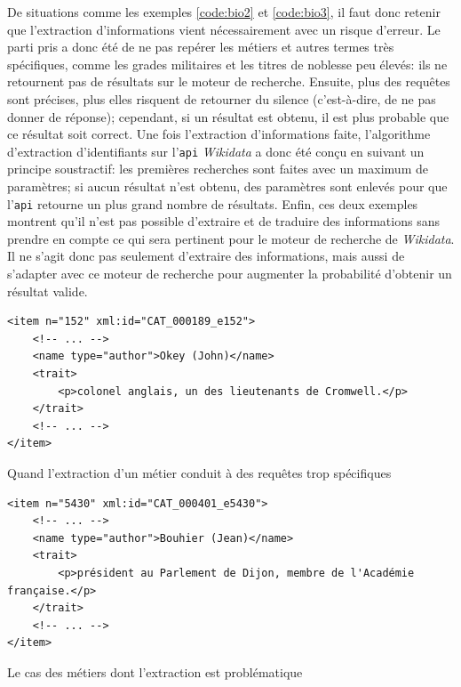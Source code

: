 \documentclass[a4paper, 12pt, twoside]{book}
\newenvironment{code}{\captionsetup{type=listing}}{}
\newcommand{\scl}[1]{%
	#1%
	\ifthenelse{\equal{#1}{I}}{\up{er}}{\up{ème}}%
	~s.%
}
\newcommand{\api}{\texttt{\gls{api}}}
\newcommand{\wkd}{\textit{Wikidata}}
\begin{document}
De situations comme les exemples \ref{code:bio2} et \ref{code:bio3}, il faut donc retenir que l'extraction d'informations vient nécessairement avec un risque d'erreur. Le parti pris a donc été de ne pas repérer les métiers et autres termes très spécifiques, comme les grades militaires et les titres de noblesse peu élevés: ils ne retournent pas de résultats sur le moteur de recherche. Ensuite, plus des requêtes sont précises, plus elles risquent de retourner du silence (c'est-à-dire, de ne pas donner de réponse); cependant, si un résultat est obtenu, il est plus probable que ce résultat soit correct. Une fois l'extraction d'informations faite, l'algorithme d'extraction d'identifiants sur l'\api{} \wkd{} a donc été conçu en suivant un principe soustractif: les premières recherches sont faites avec un maximum de paramètres; si aucun résultat n'est obtenu, des paramètres sont enlevés pour que l'\api{} retourne un plus grand nombre de résultats. Enfin, ces deux exemples montrent qu'il n'est pas possible d'extraire et de traduire des informations sans prendre en compte ce qui sera pertinent pour le moteur de recherche de \wkd{}. Il ne s'agit donc pas seulement d'extraire des informations, mais aussi de s'adapter avec ce moteur de recherche pour augmenter la probabilité d'obtenir un résultat valide.

\begin{code}
	\begin{verbatim}
<item n="152" xml:id="CAT_000189_e152">
	<!-- ... -->
	<name type="author">Okey (John)</name>
	<trait>
		<p>colonel anglais, un des lieutenants de Cromwell.</p>
	</trait>
	<!-- ... -->
</item>
	\end{verbatim}
	\caption{Quand l'extraction d'un métier conduit à des requêtes trop spécifiques}
	\label{code:bio2}
\end{code}

\begin{code}
	\begin{verbatim}
<item n="5430" xml:id="CAT_000401_e5430">
	<!-- ... -->
	<name type="author">Bouhier (Jean)</name>
	<trait>
		<p>président au Parlement de Dijon, membre de l'Académie française.</p>
	</trait>
	<!-- ... -->
</item>
	\end{verbatim}
	\caption{Le cas des métiers dont l'extraction est problématique}
	\label{code:bio3}
\end{code}

\end{document}
